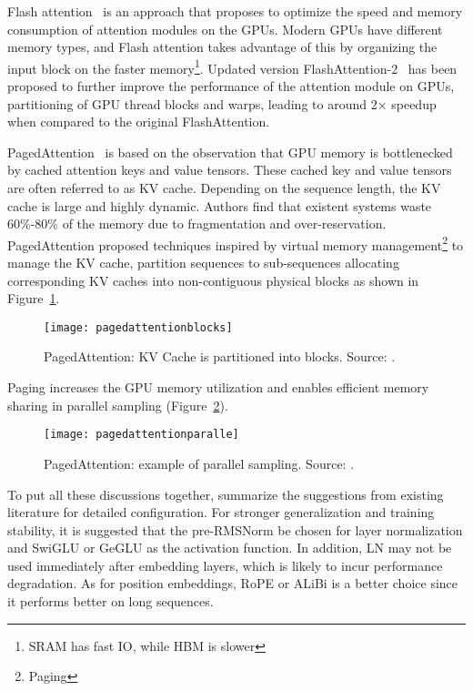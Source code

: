 Flash attention~\cite{dao2022flashattention} is an approach that proposes to optimize the speed and memory consumption of attention modules on the GPUs.
Modern GPUs have different memory types, and Flash attention takes advantage of this by organizing the input block on the faster memory\footnote{SRAM has fast IO, while HBM is slower}.
Updated version FlashAttention-2~\cite{liu2022fast} has been proposed to further improve the performance of the attention module on GPUs, partitioning of GPU thread blocks and warps, leading to around 2× speedup when compared to the original FlashAttention.

PagedAttention~\cite{vllm2023} is based on the observation that GPU memory is bottlenecked by cached attention keys and value tensors.
These cached key and value tensors are often referred to as KV cache.
Depending on the sequence length, the KV cache is large and highly dynamic.
Authors find that existent systems waste 60\%-80\% of the memory due to fragmentation and over-reservation.
PagedAttention proposed techniques inspired by virtual memory management\footnote{Paging} to manage the KV cache, partition sequences to sub-sequences allocating corresponding KV caches into non-contiguous physical blocks as shown in Figure~\ref{fig:paging}.

\begin{figure}[h]
	\centering
	\texttt{[image: pagedattentionblocks]}
	\caption{PagedAttention: KV Cache is partitioned into blocks. Source: \textcite{vllm2023}.}
	\label{fig:paging}
\end{figure}

Paging increases the GPU memory utilization and enables efficient memory sharing in parallel sampling (Figure~\ref{fig:paging-parallel}).

\begin{figure}[h]
	\centering
	\texttt{[image: pagedattentionparalle]}
	\caption{PagedAttention: example of parallel sampling. Source: \textcite{vllm2023}.}
	\label{fig:paging-parallel}
\end{figure}

To put all these discussions together, \textcite{survey} summarize the suggestions from existing literature for detailed configuration.
For stronger generalization and training stability, it is suggested that the pre-RMSNorm be chosen for layer normalization and SwiGLU or GeGLU as the activation function.
In addition, LN may not be used immediately after embedding layers, which is likely to incur performance degradation.
As for position embeddings, RoPE or ALiBi is a better choice since it performs better on long sequences.

